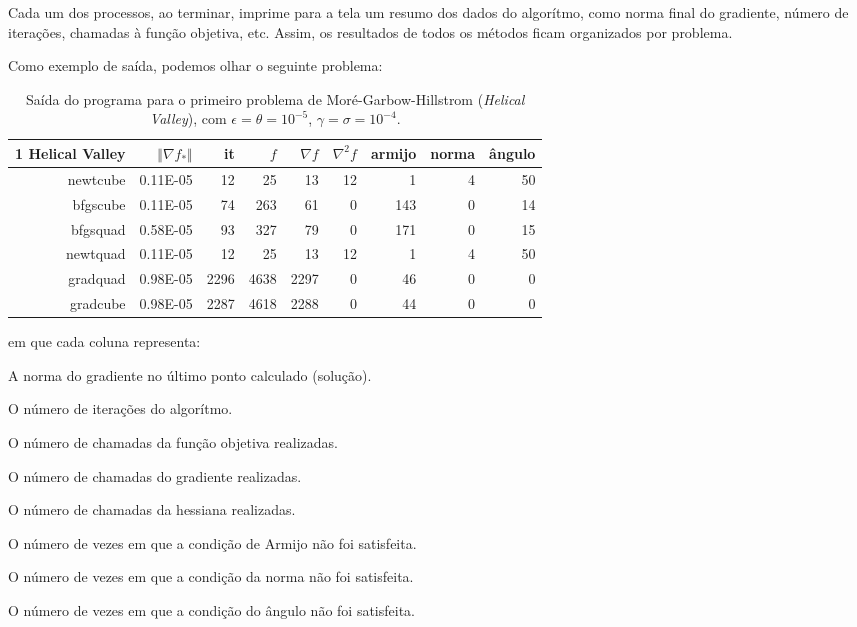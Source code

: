 \documentclass[a4paper,11pt]{article}
\begin{document}
            Cada um dos processos, ao terminar, imprime para a tela um resumo dos dados do algorítmo, como norma final do gradiente, número de iterações, chamadas à função objetiva, etc.
            Assim, os resultados de todos os métodos ficam organizados por problema.

            Como exemplo de saída, podemos olhar o seguinte problema:
            \begin{table}[h]
                \centering
                \begin{tabular}{r|rrrrrrrr}
                    1 Helical Valley  & $\Vert\nabla f_*\Vert$ & it & $f$ & $\nabla f $ & $\nabla^2f$ & armijo & norma & ângulo \\
                    \hline
                    newtcube & 0.11E-05  &      12  &      25  &      13   &     12   &      1    &     4   &     50 \\
                    bfgscube & 0.11E-05  &      74  &     263  &      61   &      0   &    143    &     0   &     14 \\
                    bfgsquad & 0.58E-05  &      93  &     327  &      79   &      0   &    171    &     0   &     15 \\
                    newtquad & 0.11E-05  &      12  &      25  &      13   &     12   &      1    &     4   &     50 \\
                    gradquad & 0.98E-05  &    2296  &    4638  &    2297   &      0   &     46    &     0   &      0 \\
                    gradcube & 0.98E-05  &    2287  &    4618  &    2288   &      0   &     44    &     0   &      0 \\
                \end{tabular}
                \caption{Saída do programa para o primeiro problema de Moré-Garbow-Hillstrom (\emph{Helical Valley}), com $\epsilon = \theta = 10^{-5} $, $\gamma = \sigma = 10^{-4}$.}
            \end{table}

            em que cada coluna representa:
            \begin{description}[align=right, leftmargin=4\parindent,labelindent=4\parindent]
                \item [$\Vert\nabla f_*\Vert$] A norma do gradiente no último ponto calculado (solução).
                \item [it] O número de iterações do algorítmo.
                \item [$f$] O número de chamadas da função objetiva realizadas.
                \item [$\nabla f $] O número de chamadas do gradiente realizadas.
                \item [$\nabla^2f$] O número de chamadas da hessiana realizadas.
                \item [armijo] O número de vezes em que a condição de Armijo não foi satisfeita.
                \item [norma] O número de vezes em que a condição da norma não foi satisfeita.
                \item [ângulo] O número de vezes em que a condição do ângulo não foi satisfeita.
            \end{description}
\end{document}
